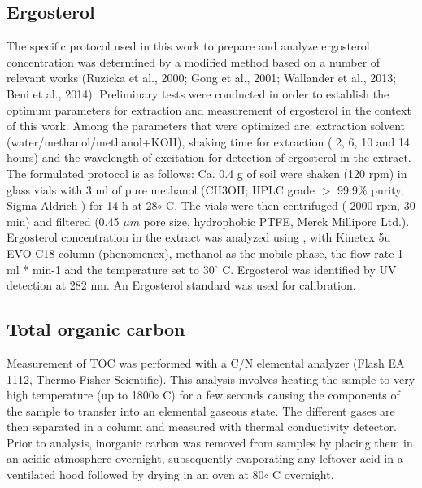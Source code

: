     \subsection{Ergosterol}
    	The specific protocol used in this work to prepare and analyze ergosterol concentration was determined by a modified method based on a number of relevant works (Ruzicka et al., 2000; Gong et al., 2001; Wallander et al., 2013; Beni et al., 2014). Preliminary tests were conducted in order to establish the optimum parameters for extraction and measurement of ergosterol in the context of this work. Among the parameters that were optimized are: extraction solvent (water/methanol/methanol+KOH), shaking time for extraction ( 2, 6, 10 and 14 hours) and the wavelength of excitation for detection of ergosterol in the extract. The formulated protocol is as follows: Ca. 0.4 g of soil were shaken (120 rpm) in glass vials with 3 ml of pure methanol (CH3OH; HPLC grade $ > $ 99.9\% purity, Sigma-Aldrich ) for 14 h at 28$ \circ $ C. The vials were then centrifuged ( 2000 rpm, 30 min) and filtered (0.45 $ \mu m $ pore size, hydrophobic PTFE, Merck Millipore Ltd.). Ergosterol concentration in the extract was analyzed using  , with Kinetex 5u EVO C18 column (phenomenex), methanol as the mobile phase, the flow rate 1 ml * min-1 and the temperature set to 30$ ^\circ $  C. Ergosterol was identified by UV detection at 282 nm. An Ergosterol standard was used for calibration.


    \subsection{Total organic carbon}

    	Measurement of TOC was performed with a C/N elemental analyzer (Flash EA 1112, Thermo Fisher Scientific). This analysis involves heating the sample to very high temperature (up to 1800$\circ$ C) for a few seconds causing the components of the sample to transfer into an elemental gaseous state. The different gases are then separated in a column and measured with thermal conductivity detector. Prior to analysis, inorganic carbon was removed from samples by placing them in an acidic atmosphere overnight, subsequently evaporating any leftover acid in a ventilated hood followed by drying in an oven at 80$\circ$ C overnight.


